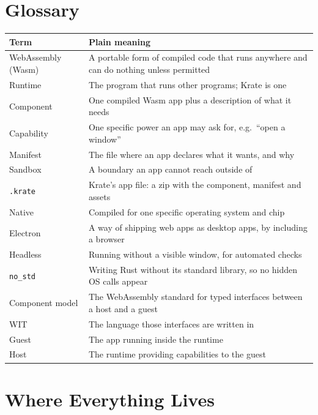 \documentclass[11pt,a4paper]{report}
\begin{document}
\chapter{Glossary}

\begin{longtable}{lp{10.4cm}}
\toprule
\textbf{Term} & \textbf{Plain meaning} \\
\midrule
\endhead
WebAssembly (Wasm) & A portable form of compiled code that runs anywhere and can do nothing unless permitted \\
Runtime & The program that runs other programs; Krate is one \\
Component & One compiled Wasm app plus a description of what it needs \\
Capability & One specific power an app may ask for, e.g.\ ``open a window'' \\
Manifest & The file where an app declares what it wants, and why \\
Sandbox & A boundary an app cannot reach outside of \\
\texttt{.krate} & Krate's app file: a zip with the component, manifest and assets \\
Native & Compiled for one specific operating system and chip \\
Electron & A way of shipping web apps as desktop apps, by including a browser \\
Headless & Running without a visible window, for automated checks \\
\texttt{no\_std} & Writing Rust without its standard library, so no hidden OS calls appear \\
Component model & The WebAssembly standard for typed interfaces between a host and a guest \\
WIT & The language those interfaces are written in \\
Guest & The app running inside the runtime \\
Host & The runtime providing capabilities to the guest \\
\bottomrule
\end{longtable}

\chapter{Where Everything Lives}
\end{document}
